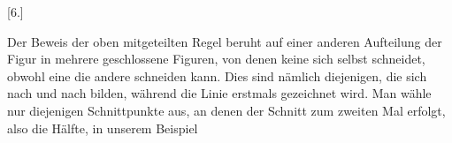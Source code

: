 \begin{center}[6.]\end{center}

Der Beweis der oben mitgeteilten Regel beruht auf einer anderen Aufteilung
der Figur in mehrere geschlossene Figuren, von denen keine sich selbst
schneidet, obwohl eine die andere schneiden kann. Dies sind nämlich
diejenigen, die sich nach und nach bilden, während die Linie erstmals gezeichnet
wird. Man wähle nur diejenigen Schnittpunkte aus, an denen der Schnitt
zum zweiten Mal erfolgt, also die Hälfte, in unserem Beispiel
